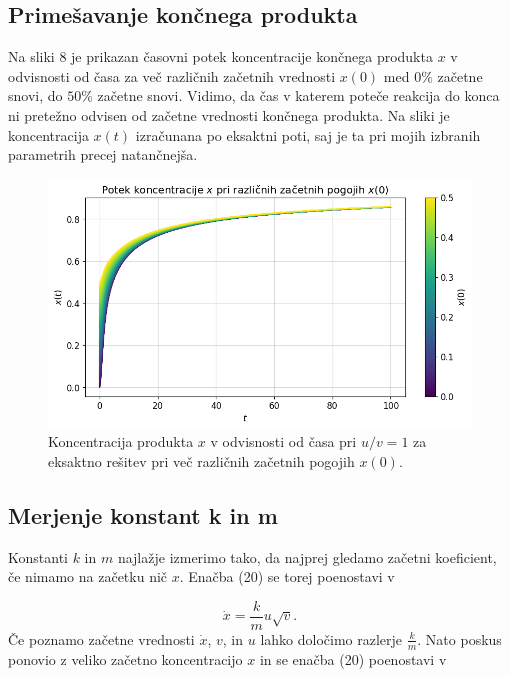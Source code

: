 \documentclass[slovene,11pt,a4paper]{article}
\begin{document}
\subsection{Primešavanje končnega produkta}

Na sliki 8 je prikazan časovni potek koncentracije končnega produkta $x$ v odvisnosti od časa za več različnih začetnih vrednosti $x(0)$ med $0\%$ začetne snovi, do $50\%$ začetne snovi. Vidimo, da čas v katerem poteče reakcija do konca ni pretežno odvisen od začetne vrednosti končnega produkta. Na sliki je koncentracija $x(t)$ izračunana po eksaktni poti, saj je ta pri mojih izbranih parametrih precej natančnejša.

\begin{figure}[h!]
\centering
\includegraphics[width=15cm]{bromid5.png}
\caption{Koncentracija produkta $x$ v odvisnosti od časa pri $u/v=1$ za eksaktno rešitev pri več različnih začetnih pogojih $x(0)$.}
\end{figure}

\newpage

\subsection{Merjenje konstant k in m}

Konstanti $k$ in $m$ najlažje izmerimo tako, da najprej gledamo začetni koeficient, če nimamo na začetku nič $x$. Enačba (20) se torej poenostavi v

\begin{equation}
\dot{x} = \frac{k}{m} u \sqrt{v}.
\end{equation}
Če poznamo začetne vrednosti $\dot{x}$, $v$, in $u$ lahko določimo razlerje $\frac{k}{m}$. Nato poskus ponovio z veliko začetno koncentracijo $x$ in se enačba (20) poenostavi v
\end{document}
